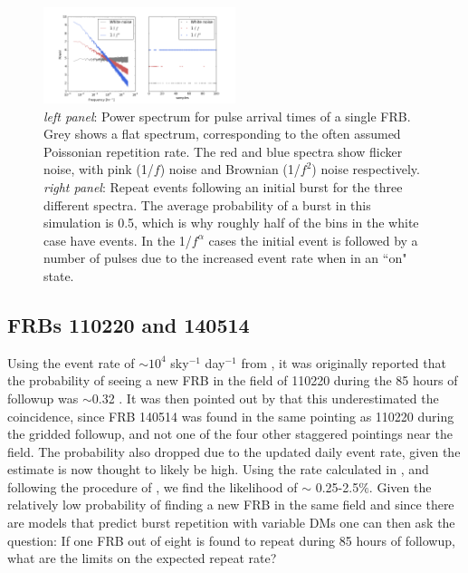\documentclass[useAMS,usenatbib]{mn2e}
\begin{document}
\begin{figure}
  \centering
   \includegraphics[trim={.5in, 0in, .5in, 0in}, width=0.5\textwidth, height=0.27\textwidth]{frb_sim_pink.png}
   \caption{\textit{left panel}: Power spectrum for pulse arrival times of a single FRB.
   Grey shows a flat spectrum, corresponding to the often assumed Poissonian 
   repetition rate. The red and blue spectra show flicker noise, with pink (1/$f$) 
   noise and Brownian (1/$f^2$) noise respectively. \textit{right panel}: 
   Repeat events following an initial burst for the three different spectra. The average 
   probability of a burst in this simulation is 0.5, which is why roughly half of the 
   bins in the white case have events. In the 1/$f^\alpha$ cases the initial event 
   is followed by a number of pulses due to the increased event rate when in an 
   ``on" state.}
   \label{FIG-RATE}
\end{figure}


\subsection{FRBs 110220 and 140514}
Using the event rate of $\sim10^4$ sky$^{-1}$ day$^{-1}$
from \cite{2013Sci...341...53T}, it 
was originally reported that the probability of seeing a 
new FRB in the field of 110220 during the 85 hours of followup 
was $\sim$0.32  
\citep{2015MNRAS.447..246P}. It was then pointed out by \cite{2015arXiv150701002M} 
that this underestimated the coincidence, since FRB 140514
was found in the same pointing as 110220 during the gridded followup, 
and not one of the four other staggered pointings near the field. 
The probability also dropped due to the updated daily event rate,
given the \cite{2013Sci...341...53T} estimate is now thought to likely be high.
Using the rate calculated in \cite{2015arXiv150500834R}, and following
the procedure of \cite{2015arXiv150701002M}, we find the likelihood of 
$\sim$ 0.25-2.5$\%$. Given the relatively low probability of finding 
a new FRB in the same field and since there are models that predict
burst repetition with variable DMs \citep{2015arXiv150505535C, 2015arXiv150701002M}
one can then ask the question: If one FRB out of eight is found to
repeat during 85 hours of followup, what are the limits on the expected
repeat rate? 
\end{document}
